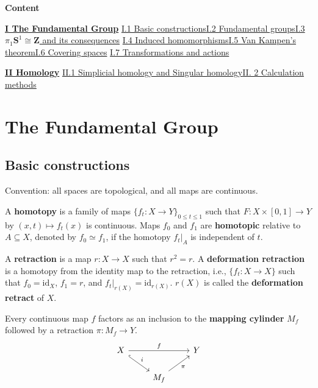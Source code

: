 \documentclass[11pt]{article}
\newcommand{\forceindent}{\leavevmode{\parindent=1.5em\indent}}
\theoremstyle{definition}
\theoremstyle{plain}
\theoremstyle{remark}
\newcommand{\id}{\textrm{id}}
\newcommand{\Z}{\mathbf{Z}}
\begin{document}
\textbf{\Large{Content}}\bigbreak

\hyperref[1]{\textbf{I The Fundamental Group}}\newline
\forceindent\hyperref[2]{I.1 Basic constructions}\quad\hyperref[3]{I.2 Fundamental groups}\quad\hyperref[4]{I.3 $\pi_1\mathbf{S}^1\cong\Z$ and its consequences}\newline
\forceindent\hyperref[6]{I.4 Induced homomorphisms}\quad\hyperref[7]{I.5 Van Kampen's theorem}\quad\hyperref[8]{I.6 Covering spaces}\newline
\forceindent\hyperref[9]{I.7 Transformations and actions}\medbreak

\hyperref[10]{\textbf{II Homology}}\newline
\forceindent\hyperref[11]{II.1 Simplicial homology and Singular homology}\quad\hyperref[12]{II. 2 Calculation methods}

\newpage
\section{The Fundamental Group}\label{1}

\subsection{Basic constructions}\label{2}

Convention: all spaces are topological, and all maps are continuous.\medbreak

A \textbf{homotopy} is a family of maps $\{f_t:X\to Y\}_{0\leq t\leq1}$ such that $F:X\times[0,1]\to Y$ by $(x,t)\mapsto f_t(x)$ is continuous. Maps $f_0$ and $f_1$ are \textbf{homotopic} relative to $A\subseteq X$, denoted by $f_0\simeq f_1$, if the homotopy $f_t|_A$ is independent of $t$.\medbreak

A \textbf{retraction} is a map $r:X\to X$ such that $r^2=r$. A \textbf{deformation retraction} is a homotopy from the identity map to the retraction, i.e., $\{f_t:X\to X\}$ such that $f_0=\id_X$, $f_1=r$, and $f_t|_{r(X)}=\id_{r(X)}$. $r(X)$ is called the \textbf{deformation retract} of $X$.\medbreak

Every continuous map $f$ factors as an inclusion to the \textbf{mapping cylinder} $M_f$ followed by a retraction $\pi:M_f\to Y$.
\[\begin{tikzcd}
X\arrow[hookrightarrow]{dr}{i}\arrow{rr}{f}&&Y\\
&M_f\arrow[swap]{ur}{\pi}
\end{tikzcd}\]\medbreak
\end{document}

